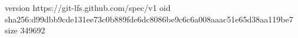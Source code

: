 version https://git-lfs.github.com/spec/v1
oid sha256:d99dbb9cde131ee73c0b889fde6dc8086be9c6c6a008aaac51e65d38aa119be7
size 349692
